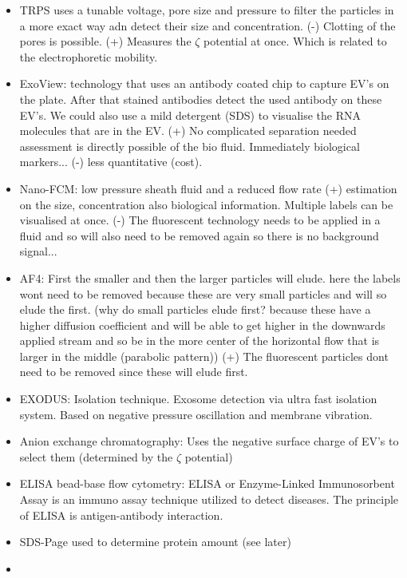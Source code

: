 \documentclass{article}
\begin{document}
\begin{itemize}
    
    \item TRPS uses a tunable voltage, pore size and pressure to filter the particles in a more exact way adn detect their size and concentration. (-) Clotting of the pores is possible. (+) Measures the $\zeta$ potential at once. Which is related to the electrophoretic mobility.
    
    \item ExoView: technology that uses an antibody coated chip to capture EV's on the plate. After that stained antibodies detect the used antibody on these EV's. We could also use a mild detergent (SDS) to visualise the RNA molecules that are in the EV.
    (+) No complicated separation needed assessment is directly possible of the bio fluid. Immediately biological markers... (-) less quantitative (cost).
    
    \item Nano-FCM: low pressure sheath fluid and a reduced flow rate
    (+) estimation on the size, concentration also biological information. Multiple labels can be visualised at once. (-) The fluorescent technology needs to be applied in a fluid and so will also need to be removed again so there is no background signal...
    
    \item AF4: First the smaller and then the larger particles will elude.
    here the labels wont need to be removed because these are very small particles and will so elude the first. (why do small particles elude first? because these have a higher diffusion coefficient and will be able to get higher in the downwards applied stream and so be in the more center of the horizontal flow that is larger in the middle (parabolic pattern)) (+) The fluorescent particles dont need to be removed since these will elude first.
    
    \item EXODUS: Isolation technique. Exosome detection via ultra fast isolation system. Based on negative pressure oscillation and membrane vibration.
    
    \item Anion exchange chromatography: Uses the negative surface charge of EV's to select them (determined by the $\zeta$ potential)
    
    \item ELISA bead-base flow cytometry:
    ELISA or Enzyme-Linked Immunosorbent Assay is an immuno assay technique utilized to detect diseases. The principle of ELISA is antigen-antibody interaction.
    
    \item SDS-Page used to determine protein amount (see later)
    
    \item
\end{itemize}
\end{document}
